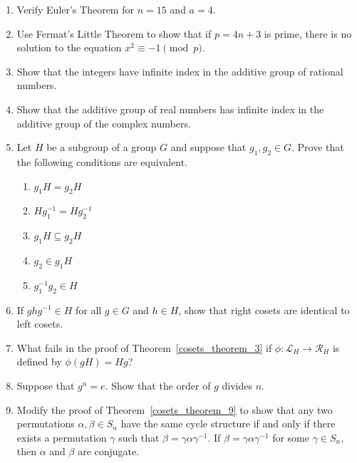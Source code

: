 {\begin{enumerate}
\item
Verify Euler's Theorem for $n = 15$ and $a = 4$.

\item
Use Fermat's Little Theorem to show that if $p= 4n+3$ is prime, there is no solution to the equation $x^2 \equiv -1 \pmod{p}$.
 
\item
Show that the integers have infinite index in the additive group of rational numbers.
 
\item
Show that the additive group of real numbers has infinite index in the additive group of the complex numbers.
 
\item
Let $H$ be a subgroup of a group $G$ and suppose that $g_1, g_2 \in G$.  Prove that the following conditions are equivalent.
\begin{enumerate}
 
\item
$g_1 H = g_2 H$
 
\item
$H g_1^{-1}  = H g_2^{-1}$
 
\item
$g_1 H \subseteq g_2 H$
 
\item
$g_2 \in g_1 H$
 
\item
$g_1^{-1} g_2 \in H$
 
\end{enumerate}
 
\item
If $ghg^{-1} \in H$ for all $g \in G$ and $h \in H$, show that right cosets are identical to left cosets.
 
\item
What fails in the proof of Theorem~\ref{cosets_theorem_3} if $\phi :  {\mathcal L}_H \rightarrow {\mathcal R}_H$ is defined by $\phi( gH ) = Hg$?
 
\item
Suppose that $g^n = e$. Show that the order of $g$ divides
$n$.
 
\item
Modify the proof of Theorem~\ref{cosets_theorem_9} to show that any two permutations $\alpha, \beta \in S_n$ have the same cycle structure if and only if there exists a  permutation $\gamma$ such that $\beta = \gamma \alpha \gamma^{-1}$.  If $\beta = \gamma \alpha \gamma^{-1}$ for some $\gamma \in S_n$, then $\alpha$ and $\beta$ are {\bfi conjugate}.


\end{enumerate}}
